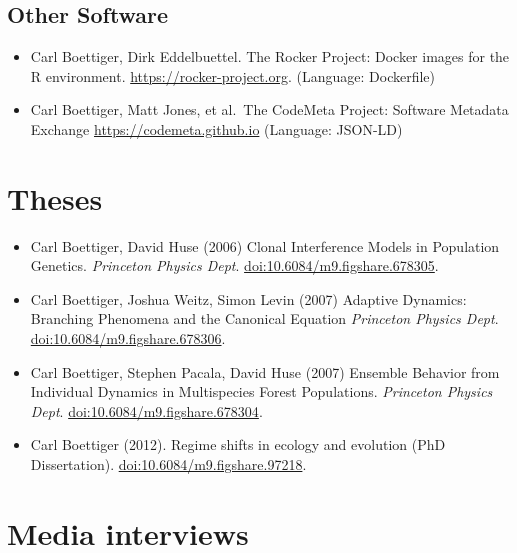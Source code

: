 \documentclass[10pt,sans]{moderncv}        %
\providecommand{\tightlist}{%
    \setlength{\itemsep}{0pt}\setlength{\parskip}{0pt}}
\begin{document}
\hypertarget{other-software}{%
\subsection{Other Software}\label{other-software}}

\begin{itemize}
\tightlist
\item
  Carl Boettiger, Dirk Eddelbuettel. The Rocker Project: Docker images
  for the R environment. \url{https://rocker-project.org}. (Language:
  Dockerfile)
\item
  Carl Boettiger, Matt Jones, et al.~The CodeMeta Project: Software
  Metadata Exchange \url{https://codemeta.github.io} (Language: JSON-LD)
\end{itemize}

\hypertarget{theses}{%
\section{Theses}\label{theses}}

\begin{itemize}
\tightlist
\item
  Carl Boettiger, David Huse (2006) Clonal Interference Models in
  Population Genetics. \emph{Princeton Physics Dept}.
  \href{http://dx.doi.org/10.6084/m9.figshare.678305}{doi:10.6084/m9.figshare.678305}.
\item
  Carl Boettiger, Joshua Weitz, Simon Levin (2007) Adaptive Dynamics:
  Branching Phenomena and the Canonical Equation \emph{Princeton Physics
  Dept}.
  \href{http://dx.doi.org/10.6084/m9.figshare.678306}{doi:10.6084/m9.figshare.678306}.
\item
  Carl Boettiger, Stephen Pacala, David Huse (2007) Ensemble Behavior
  from Individual Dynamics in Multispecies Forest Populations.
  \emph{Princeton Physics Dept}.
  \href{http://dx.doi.org/10.6084/m9.figshare.678304}{doi:10.6084/m9.figshare.678304}.
\item
  Carl Boettiger (2012). Regime shifts in ecology and evolution (PhD
  Dissertation).
  \href{http://dx.doi.org/10.6084/m9.figshare.97218}{doi:10.6084/m9.figshare.97218}.
\end{itemize}

\hypertarget{media-interviews}{%
\section{Media interviews}\label{media-interviews}}
\end{document}
